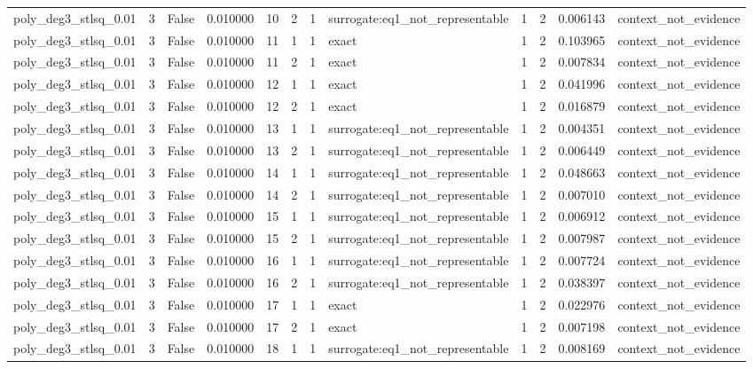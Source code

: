 \begin{tabular}{lrrrrrrlrrrl}
poly\_deg3\_stlsq\_0.01 & 3 & False & 0.010000 & 10 & 2 & 1 & surrogate:eq1\_not\_representable & 1 & 2 & 0.006143 & context\_not\_evidence \\
poly\_deg3\_stlsq\_0.01 & 3 & False & 0.010000 & 11 & 1 & 1 & exact & 1 & 2 & 0.103965 & context\_not\_evidence \\
poly\_deg3\_stlsq\_0.01 & 3 & False & 0.010000 & 11 & 2 & 1 & exact & 1 & 2 & 0.007834 & context\_not\_evidence \\
poly\_deg3\_stlsq\_0.01 & 3 & False & 0.010000 & 12 & 1 & 1 & exact & 1 & 2 & 0.041996 & context\_not\_evidence \\
poly\_deg3\_stlsq\_0.01 & 3 & False & 0.010000 & 12 & 2 & 1 & exact & 1 & 2 & 0.016879 & context\_not\_evidence \\
poly\_deg3\_stlsq\_0.01 & 3 & False & 0.010000 & 13 & 1 & 1 & surrogate:eq1\_not\_representable & 1 & 2 & 0.004351 & context\_not\_evidence \\
poly\_deg3\_stlsq\_0.01 & 3 & False & 0.010000 & 13 & 2 & 1 & surrogate:eq1\_not\_representable & 1 & 2 & 0.006449 & context\_not\_evidence \\
poly\_deg3\_stlsq\_0.01 & 3 & False & 0.010000 & 14 & 1 & 1 & surrogate:eq1\_not\_representable & 1 & 2 & 0.048663 & context\_not\_evidence \\
poly\_deg3\_stlsq\_0.01 & 3 & False & 0.010000 & 14 & 2 & 1 & surrogate:eq1\_not\_representable & 1 & 2 & 0.007010 & context\_not\_evidence \\
poly\_deg3\_stlsq\_0.01 & 3 & False & 0.010000 & 15 & 1 & 1 & surrogate:eq1\_not\_representable & 1 & 2 & 0.006912 & context\_not\_evidence \\
poly\_deg3\_stlsq\_0.01 & 3 & False & 0.010000 & 15 & 2 & 1 & surrogate:eq1\_not\_representable & 1 & 2 & 0.007987 & context\_not\_evidence \\
poly\_deg3\_stlsq\_0.01 & 3 & False & 0.010000 & 16 & 1 & 1 & surrogate:eq1\_not\_representable & 1 & 2 & 0.007724 & context\_not\_evidence \\
poly\_deg3\_stlsq\_0.01 & 3 & False & 0.010000 & 16 & 2 & 1 & surrogate:eq1\_not\_representable & 1 & 2 & 0.038397 & context\_not\_evidence \\
poly\_deg3\_stlsq\_0.01 & 3 & False & 0.010000 & 17 & 1 & 1 & exact & 1 & 2 & 0.022976 & context\_not\_evidence \\
poly\_deg3\_stlsq\_0.01 & 3 & False & 0.010000 & 17 & 2 & 1 & exact & 1 & 2 & 0.007198 & context\_not\_evidence \\
poly\_deg3\_stlsq\_0.01 & 3 & False & 0.010000 & 18 & 1 & 1 & surrogate:eq1\_not\_representable & 1 & 2 & 0.008169 & context\_not\_evidence \\

\end{tabular}
